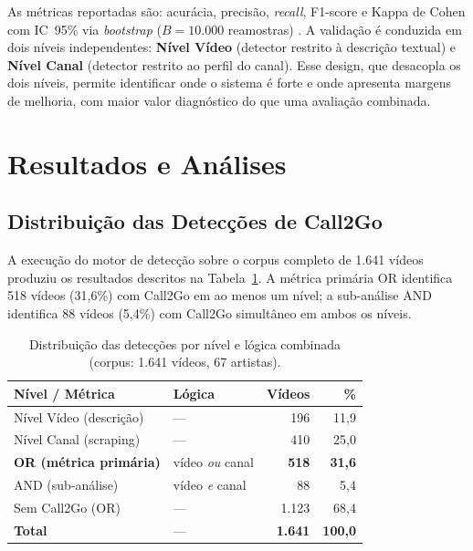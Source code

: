﻿\documentclass[12pt]{article}
\begin{document}
As métricas reportadas são: acurácia, precisão, \textit{recall}, F1-score e
Kappa de Cohen com IC~95\% via \textit{bootstrap} ($B = 10.000$ reamostras)
\cite{cohen1960}. A validação é conduzida em dois níveis independentes:
\textbf{Nível Vídeo} (detector restrito à descrição textual) e \textbf{Nível
Canal} (detector restrito ao perfil do canal). Esse design, que
desacopla os dois níveis, permite identificar onde o sistema é forte e onde
apresenta margens de melhoria, com maior valor diagnóstico do que uma
avaliação combinada.

\section{Resultados e Análises}
\label{sec:resultados}

\subsection{Distribuição das Detecções de Call2Go}

A execução do motor de detecção sobre o corpus completo de 1.641 vídeos
produziu os resultados descritos na Tabela~\ref{tab:deteccao}. A métrica
primária OR identifica 518 vídeos (31,6\%) com Call2Go em ao menos um nível;
a sub-análise AND identifica 88 vídeos (5,4\%) com Call2Go simultâneo em
ambos os níveis.

\begin{table}[H]
\centering
\caption{Distribuição das detecções por nível e lógica combinada
(corpus: 1.641 vídeos, 67 artistas).}
\label{tab:deteccao}
\renewcommand{\arraystretch}{1.2}
\begin{tabular}{@{}llrr@{}}
\toprule
\textbf{Nível / Métrica} & \textbf{Lógica} & \textbf{Vídeos} & \textbf{\%} \\
\midrule
Nível Vídeo  (descrição)          & ---                 & 196   & 11,9 \\
Nível Canal  (scraping)           & ---                 & 410   & 25,0 \\
\midrule
\textbf{OR (métrica primária)}    & vídeo \textit{ou} canal & \textbf{518} & \textbf{31,6} \\
AND (sub-análise)                 & vídeo \textit{e} canal  & 88   &  5,4 \\
Sem Call2Go (OR)                  & ---                 & 1.123 & 68,4 \\
\midrule
\textbf{Total}                    & ---                 & \textbf{1.641} & \textbf{100,0} \\
\bottomrule
\end{tabular}
\end{table}
\end{document}
